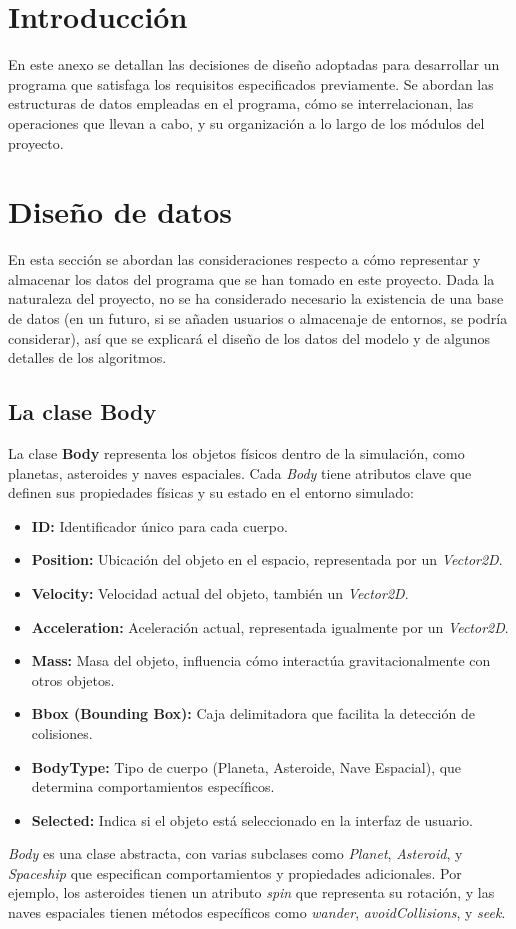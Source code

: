 \section{Introducción}
En este anexo se detallan las decisiones de diseño adoptadas para desarrollar un programa que satisfaga los requisitos especificados previamente. Se abordan las estructuras de datos empleadas en el programa, cómo se interrelacionan, las operaciones que llevan a cabo, y su organización a lo largo de los módulos del proyecto.
\section{Diseño de datos}
En esta sección se abordan las consideraciones respecto a cómo representar y almacenar los datos del programa que se han tomado en este proyecto. Dada la naturaleza del proyecto, no se ha considerado necesario la existencia de una base de datos (en un futuro, si se añaden usuarios o almacenaje de entornos, se podría considerar), así que se explicará el diseño de los datos del modelo y de algunos detalles de los algoritmos.
\subsection{La clase Body}
La clase \textbf{Body} representa los objetos físicos dentro de la simulación, como planetas, asteroides y naves espaciales. Cada \textit{Body} tiene atributos clave que definen sus propiedades físicas y su estado en el entorno simulado:
\begin{itemize}
    \item \textbf{ID:} Identificador único para cada cuerpo.
    \item \textbf{Position:} Ubicación del objeto en el espacio, representada por un \textit{Vector2D}.
    \item \textbf{Velocity:} Velocidad actual del objeto, también un \textit{Vector2D}.
    \item \textbf{Acceleration:} Aceleración actual, representada igualmente por un \textit{Vector2D}.
    \item \textbf{Mass:} Masa del objeto, influencia cómo interactúa gravitacionalmente con otros objetos.
    \item \textbf{Bbox (Bounding Box):} Caja delimitadora que facilita la detección de colisiones.
    \item \textbf{BodyType:} Tipo de cuerpo (Planeta, Asteroide, Nave Espacial), que determina comportamientos específicos.
    \item \textbf{Selected:} Indica si el objeto está seleccionado en la interfaz de usuario.
\end{itemize}
\textit{Body} es una clase abstracta, con varias subclases como \textit{Planet}, \textit{Asteroid}, y \textit{Spaceship} que especifican comportamientos y propiedades adicionales. Por ejemplo, los asteroides tienen un atributo \textit{spin} que representa su rotación, y las naves espaciales tienen métodos específicos como \textit{wander}, \textit{avoidCollisions}, y \textit{seek}.
